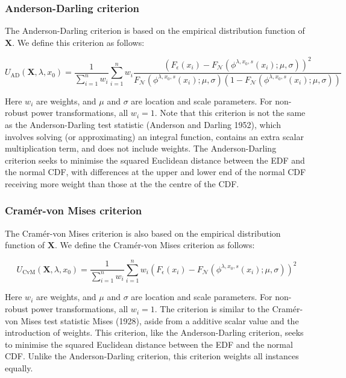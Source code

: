 \documentclass[
  a4paper,
]{article}
\begin{document}
\subsubsection{Anderson-Darling
criterion}\label{anderson-darling-criterion}

The Anderson-Darling criterion is based on the empirical distribution
function of \(\mathbf{X}\). We define this criterion as follows:

\begin{equation}
U_{\text{AD}} \left(\mathbf{X}, \lambda, x_0 \right) = \frac{1}{\sum_{i=1}^n w_i} \sum_{i=1}^n w_i \frac{\left( F_{\epsilon}\left(x_i \right) - F_{\mathcal{N}} \left(\phi^{\lambda, x_0, s} \left(x_i \right); \mu, \sigma \right) \right)^2} {F_{\mathcal{N}} \left(\phi^{\lambda, x_0, s} \left(x_i \right); \mu, \sigma \right) \left(1 - F_{\mathcal{N}} \left(\phi^{\lambda, x_0, s} \left(x_i \right); \mu, \sigma \right) \right) }
\end{equation}

Here \(w_i\) are weights, and \(\mu\) and \(\sigma\) are location and
scale parameters. For non-robust power transformations, all \(w_i = 1\).
Note that this criterion is not the same as the Anderson-Darling test
statistic (Anderson and Darling 1952), which involves solving (or
approximating) an integral function, contains an extra scalar
multiplication term, and does not include weights. The Anderson-Darling
criterion seeks to minimise the squared Euclidean distance between the
EDF and the normal CDF, with differences at the upper and lower end of
the normal CDF receiving more weight than those at the the centre of the
CDF.

\subsubsection{Cramér-von Mises
criterion}\label{cramuxe9r-von-mises-criterion}

The Cramér-von Mises criterion is also based on the empirical
distribution function of \(\mathbf{X}\). We define the Cramér-von Mises
criterion as follows:

\begin{equation}
U_{\text{CvM}} \left(\mathbf{X}, \lambda, x_0 \right) = \frac{1}{\sum_{i=1}^n w_i} \sum_{i=1}^n w_i \left( F_{\epsilon}\left(x_i \right) - F_{\mathcal{N}} \left(\phi^{\lambda, x_0, s} \left(x_i \right); \mu, \sigma \right) \right)^2
\end{equation}

Here \(w_i\) are weights, and \(\mu\) and \(\sigma\) are location and
scale parameters. For non-robust power transformations, all \(w_i = 1\).
The criterion is similar to the Cramér-von Mises test statistic Mises
(1928), aside from a additive scalar value and the introduction of
weights. This criterion, like the Anderson-Darling criterion, seeks to
minimise the squared Euclidean distance between the EDF and the normal
CDF. Unlike the Anderson-Darling criterion, this criterion weights all
instances equally.
\end{document}
